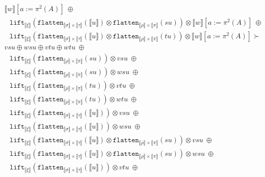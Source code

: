 \documentclass[a4paper,UKenglish,cleveref,autoref,numberwithinsect]{lipics-v2019}
\theoremstyle{definition}
\newcommand{\flatten}{\mathtt{flatten}}
\newcommand{\lift}{\mathtt{lift}}
\newcommand{\typeinterpret}[1]{\llbracket #1 \rrbracket}
\newcommand{\interpret}[1]{\llbracket #1 \rrbracket}
\begin{document}
\begin{itemize}
\[\begin{array}{l}
    \interpret{w}[a:=\pi^2(A)]
    \ \oplus \\
  \phantom{A}
    \lift_{\typeinterpret{\xi}}(\flatten_{\typeinterpret{\sigma} \times
    \typeinterpret{\tau}}(\interpret{u}) \otimes
    \flatten_{\typeinterpret{\rho} \times \typeinterpret{\pi}}(su))
    \otimes
    \interpret{w}[a:=\pi^2(A)]
    \ \oplus \\
  \phantom{A}
    \lift_{\typeinterpret{\xi}}(\flatten_{\typeinterpret{\sigma} \times
    \typeinterpret{\tau}}(\interpret{u}) \otimes
    \flatten_{\typeinterpret{\rho} \times \typeinterpret{\pi}}(tu))
    \otimes
    \interpret{w}[a:=\pi^2(A)] \succ \\
  vsu \oplus wsu \oplus
    vtu \oplus wtu\ \oplus \\
  \phantom{A}
    \lift_{\typeinterpret{\xi}}(\flatten_{\typeinterpret{\rho} \times
    \typeinterpret{\pi}}(su)) \otimes vsu\ \oplus \\
  \phantom{A}
    \lift_{\typeinterpret{\xi}}(\flatten_{\typeinterpret{\rho}
    \times \typeinterpret{\pi}}(su)) \otimes wsu\ \oplus \\
  \phantom{A}
    \lift_{\typeinterpret{\xi}}(\flatten_{\typeinterpret{\rho} \times
    \typeinterpret{\pi}}(tu)) \otimes vtu\ \oplus \\
  \phantom{A}
    \lift_{\typeinterpret{\xi}}(\flatten_{\typeinterpret{\rho}
    \times \typeinterpret{\pi}}(tu)) \otimes wtu\ \oplus \\
  \phantom{A}
    \lift_{\typeinterpret{\xi}}(\flatten_{\typeinterpret{\sigma}
    \times \typeinterpret{\tau}}(\interpret{u})) \otimes vsu\ \oplus \\
  \phantom{A}
    \lift_{\typeinterpret{\xi}}(\flatten_{\typeinterpret{\sigma}
    \times \typeinterpret{\tau}}(\interpret{u})) \otimes wsu\ \oplus \\
  \phantom{A}
    \lift_{\typeinterpret{\xi}}(\flatten_{\typeinterpret{\sigma}
    \times \typeinterpret{\tau}}(\interpret{u}) \otimes
    \flatten_{\typeinterpret{\rho} \times
    \typeinterpret{\pi}}(su)) \otimes vsu\ \oplus \\
  \phantom{A}
    \lift_{\typeinterpret{\xi}}(\flatten_{\typeinterpret{\sigma}
    \times \typeinterpret{\tau}}(\interpret{u}) \otimes
    \flatten_{\typeinterpret{\rho}
    \times \typeinterpret{\pi}}(su)) \otimes wsu\ \oplus \\
  \phantom{A}
    \lift_{\typeinterpret{\xi}}(\flatten_{\typeinterpret{\sigma}
    \times \typeinterpret{\tau}}(\interpret{u})) \otimes vtu\ \oplus \\
  \phantom{A}

\end{array}\]
\end{itemize}
\end{document}
